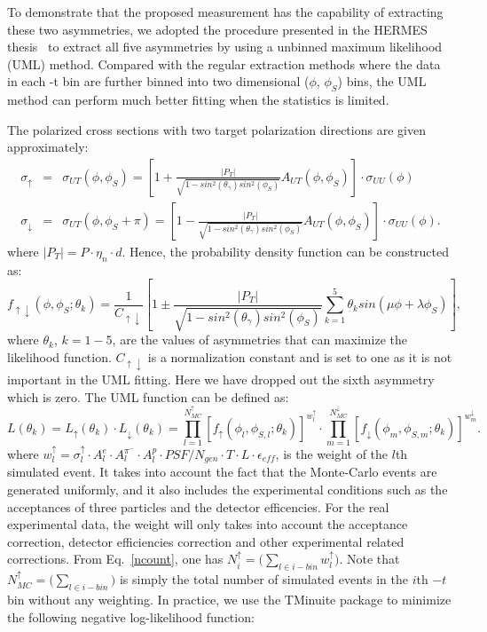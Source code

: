 To demonstrate that the proposed measurement has the capability of extracting these two asymmetries, we adopted the procedure presented in the HERMES thesis~\cite{hermes-thesis} to extract all five asymmetries by using a unbinned maximum likelihood (UML) method. Compared with the regular extraction methods where the data in each -t bin are further binned into two dimensional ($\phi$, $\phi_S$) bins, the UML method can perform much better fitting when the statistics is limited. 

The polarized cross sections with two target polarization directions are given approximately:
\begin{eqnarray}
     \sigma_{\uparrow} &=& \sigma_{UT}(\phi, \phi_{S}) = [1 + \frac{|P_{T}|}{\sqrt{1-sin^2(\theta_{\gamma})sin^2(\phi_{S})}} A_{UT}(\phi, \phi_{S})] \cdot  \sigma_{UU}(\phi) \\
     \sigma_{\downarrow} &=& \sigma_{UT}(\phi, \phi_{S}+\pi) = [1 -\frac{|P_{T}|}{\sqrt{1-sin^2(\theta_{\gamma})sin^2(\phi_{S})}} A_{UT}(\phi, \phi_{S})]\cdot \sigma_{UU}(\phi).
\end{eqnarray}
where $|P_{T}| = P\cdot \eta_{n} \cdot d $. Hence, the probability density function can be constructed as:
\begin{equation}
  f_{\uparrow\downarrow}(\phi, \phi_{S}; \theta_{k}) = \frac{1}{C_{\uparrow\downarrow}} [1 \pm \frac{|P_{T}|}{\sqrt{1-sin^2(\theta_{\gamma})sin^2(\phi_{S})}} \sum_{k=1}^{5} \theta_{k} sin(\mu\phi+\lambda\phi_{S})],
\end{equation}
where $\theta_{k}$, $k=1-5$, are the values of asymmetries that can maximize the likelihood function.  $C_{\uparrow\downarrow}$ is a normalization constant and is set to one as it is not important in the UML fitting. Here we have dropped out the sixth asymmetry which is zero. The UML function can be defined as:
\begin{equation}
	L(\theta_{k}) = L_{\uparrow}(\theta_{k})\cdot  L_{\downarrow}(\theta_{k})=\prod_{l=1}^{N_{MC}^{\uparrow}}[f_{\uparrow}(\phi_{l}, \phi_{S,l};\theta_{k})]^{w^{\uparrow}_{l}}\cdot \prod_{m=1}^{N_{MC}^{\downarrow}}[f_{\downarrow}(\phi_{m}, \phi_{S,m};\theta_{k})]^{w^{\downarrow}_{m}}.
\end{equation}
where $w^{\uparrow}_{l} =  \sigma^{\uparrow}_{l}\cdot A^{e}_{l} \cdot  A^{\pi^{-}}_{l} \cdot A^{p}_{l} \cdot PSF/N_{gen} \cdot T \cdot L \cdot \epsilon_{eff}$, is the weight of the $l$th simulated event. It takes into account the fact that the Monte-Carlo events are generated uniformly, and it also includes the experimental conditions such as the acceptances of three particles and the detector efficencies. For the real experimental data, the weight will only takes into account the acceptance correction, detector efficiencies correction and other experimental related corrections. From Eq.~\ref{ncount}, one has $ N^{\uparrow}_{i} = \bigl(\sum_{l\in i-bin}w^{\uparrow}_{l})$. Note that $N_{MC}^{\uparrow}= \bigl(\sum_{l\in i-bin})$ is simply the total number of simulated events in the $i$th $-t$ bin without any weighting. In practice, we use the TMinuite package to minimize the following negative log-likelihood function:
